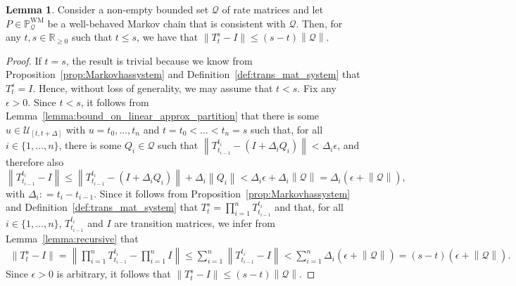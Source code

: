 \documentclass[10pt,a4paper]{paper}
\theoremstyle{definition}
\newtheorem{lemma}[theorem]{Lemma}
\newcommand{\reals}{\mathbb{R}}
\newcommand{\realsnonneg}{\reals_{\geq 0}}
\newcommand{\processes}{\mathbb{P}}
\newcommand{\wmprocesses}{\processes^{\mathrm{WM}}}
\newcommand{\rateset}{\mathcal{Q}}
\newcommand{\norm}[1]{\left\lVert #1 \right\rVert}
\newcommand{\coloneqq}{:\!=}
\begin{document}
\begin{lemma}\label{lemma:uniformelywellbehaved}
Consider a non-empty bounded set $\rateset$ of rate matrices and let $P\in\wmprocesses_{\rateset}$ be a well-behaved Markov chain that is consistent with $\rateset$. 
Then, for any $t,s\in\realsnonneg$ such that $t\leq s$, we have that $\norm{T_t^s-I}\leq(s-t)\norm{\rateset}$.
\end{lemma}
\begin{proof}
If $t=s$, the result is trivial because we know from Proposition~\ref{prop:Markovhassystem} and Definition~\ref{def:trans_mat_system} that $T_t^s=I$. Hence, without loss of generality, we may assume that $t<s$. Fix any $\epsilon>0$. Since $t<s$, it follows from Lemma~\ref{lemma:bound_on_linear_approx_partition} that there is some $u\in\mathcal{U}_{[t,t+\Delta]}$ with $u=t_0,\ldots,t_n$ and $t=t_0<\ldots< t_n=s$ such that, for all $i\in\{1,\ldots,n\}$, there is some $Q_i\in\rateset$ such that $\norm{T_{t_{i-1}}^{t_i} - (I+\Delta_iQ_i)} < \Delta_i\epsilon$, and therefore also
\begin{equation*}
\norm{T_{t_{i-1}}^{t_i} - I}
\leq\norm{T_{t_{i-1}}^{t_i} - (I+\Delta_iQ_i)}+\Delta_i\norm{Q_i} < \Delta_i\epsilon+\Delta_i\norm{\rateset}=\Delta_i(\epsilon+\norm{\rateset}),
\end{equation*}
with $\Delta_i\coloneqq t_{i}-t_{i-1}$. Since it follows from Proposition~\ref{prop:Markovhassystem} and Definition~\ref{def:trans_mat_system} that $T_t^s=\prod_{i=1}^n T_{t_{i-1}}^{t_i}$ and that, for all $i\in\{1,\dots,n\}$, $T_{t_{i-1}}^{t_i}$ and $I$ are transition matrices, we infer from Lemma~\ref{lemma:recursive} that
\begin{align*}
\norm{T_t^s-I}
=\norm{\prod_{i=1}^nT_{t_{i-1}}^{t_i}-\prod_{i=1}^n I}
\leq\sum_{i=1}^n\norm{T_{t_{i-1}}^{t_i}-I}
<
\sum_{i=1}^n
\Delta_i(\epsilon+\norm{\rateset})
=(s-t)(\epsilon+\norm{\rateset}).
\end{align*}
Since $\epsilon>0$ is arbitrary, it follows that $\norm{T_t^s-I}\leq(s-t)\norm{\rateset}$.
\end{proof}
\end{document}
